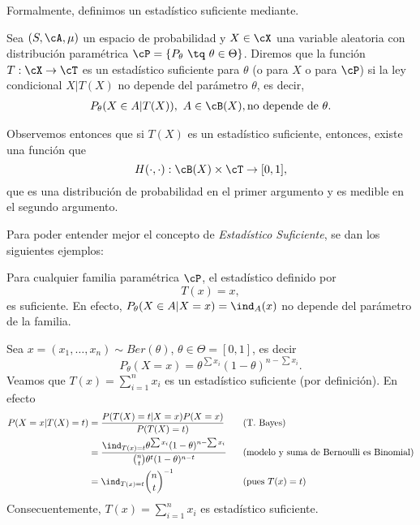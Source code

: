 Formalmente, definimos un estadístico suficiente mediante. 
\begin{definition}
\label{def:estadístico_suficiente}
Sea $(S,\cA,\mu)$ un espacio de probabilidad y $X\in\cX$ una variable aleatoria con distribución paramétrica $\cP = \{P_\theta\ \tq\ \theta\in\Theta\}$. Diremos que la función $T:\cX\rightarrow\cT$ es un estadístico suficiente para $\theta$ (o para $X$ o para $\cP$) si la ley condicional $X|T(X)$ no depende del parámetro $\theta$, es decir, 
\begin{align}
\nonumber
	P_\theta(X\in A | T(X)),\ A\in\cB(X), \text{no depende de }\theta.
\end{align} 
\end{definition}

Observemos entonces que si $T(X)$ es un estadístico suficiente, entonces, existe una función que
\begin{equation}
\nonumber
	H(\cdot,\cdot): \cB(X)\times\cT \rightarrow [0,1],
\end{equation}
que es una distribución de probabilidad en el primer argumento y es medible en el segundo argumento.

Para poder entender mejor el concepto de \emph{Estadístico Suficiente}, se dan los siguientes ejemplos:

\begin{example}
	\label{ex:suficiencia_trivial}
	Para cualquier familia paramétrica $\cP$, el estadístico definido por
	\begin{equation}
	\nonumber
		T(x) = x,
	\end{equation}
es suficiente. En efecto, $P_\theta(X\in A|X=x) = \ind_{A}(x)$ no depende del parámetro de la familia. 
\end{example}

\begin{example}
	Sea $x=(x_1,\ldots,x_n) \sim Ber(\theta)$, $\theta \in \Theta = [0,1]$, es decir
	\begin{equation}
	\nonumber
		P_\theta(X=x) = \theta^{\sum x_i}(1-\theta)^{n-\sum x_i}.
	\end{equation}
	Veamos que $T(x) = \sum\limits_{i=1}^{n} x_i$ es un estadístico suficiente (por definición). En efecto
	\begin{alignat*}{3}
		P(X=x|T(X)=t) 	&= \frac{P(T(X)=t| X=x )P( X=x )}{P(T(X)=t)} \quad&&\text{(T. Bayes)}\\
						&= \frac{\ind_{T(x)=t}\theta^{\sum x_i}(1-\theta)^{n-\sum x_i}}{\binom{n}{t}\theta^t(1-\theta)^{n-t}} &&\text{(modelo y suma de Bernoulli es Binomial)}\\
						&= \ind_{T(x)=t} \binom{n}{t}^{-1} && \text{(pues $T(x)=t$)}
	\end{alignat*}
	Consecuentemente, $T(x)=\sum\limits_{i=1}^{n} x_i$ es estadístico suficiente.
\end{example}

